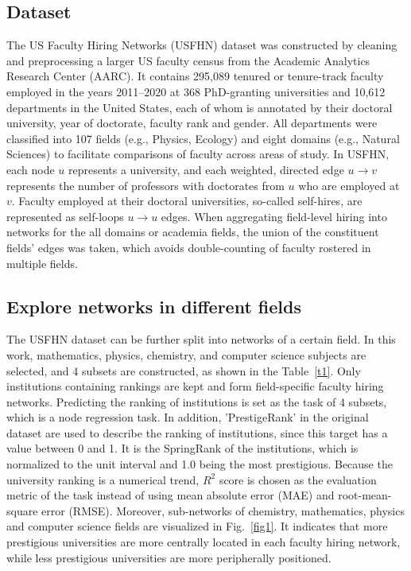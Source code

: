 \documentclass[journal]{IEEEtran}
\begin{document}
\subsection{Dataset}
The US Faculty Hiring Networks (USFHN) dataset was constructed by cleaning and preprocessing a larger US faculty census from the Academic Analytics Research Center (AARC). It contains 295,089 tenured or tenure-track faculty employed in the years 2011–2020 at 368 PhD-granting universities and 10,612 departments in the United States, each of whom is annotated by their doctoral university, year of doctorate, faculty rank and gender. All departments were classified into 107 fields (e.g., Physics, Ecology) and eight domains (e.g., Natural Sciences) to facilitate comparisons of faculty across areas of study. In USFHN, each node $u$ represents a university, and each weighted, directed edge $u \to v$ represents the number of professors with doctorates from $u$ who are employed at $v$. Faculty employed at their doctoral universities, so-called self-hires, are represented as self-loops $u \to u$ edges. When aggregating field-level hiring into networks for the all domains or academia fields, the union of the constituent fields’ edges was taken, which avoids double-counting of faculty rostered in multiple fields. 

\subsection{Explore networks in different fields}
The USFHN dataset can be further split into networks of a certain field. In this work, mathematics, physics, chemistry, and computer science subjects are selected, and 4 subsets are constructed, as shown in the Table~\ref{t1}. Only institutions containing rankings are kept and form field-specific faculty hiring networks. Predicting the ranking of institutions is set as the task of 4 subsets, which is a node regression task. In addition, 'PrestigeRank' in the original dataset are used to describe the ranking of institutions, since this target has a value between 0 and 1. It is the SpringRank of the institutions, which is normalized to the unit interval and 1.0 being the most prestigious. Because the university ranking is a numerical trend, $R^2$ score is chosen as the evaluation metric of the task instead of using mean absolute error (MAE) and root-mean-square error (RMSE). Moreover, sub-networks of chemistry, mathematics, physics and computer science fields are visualized in Fig.~\ref{fig1}. It indicates that more prestigious universities are more centrally located in each faculty hiring network, while less prestigious universities are more peripherally positioned.
\end{document}
